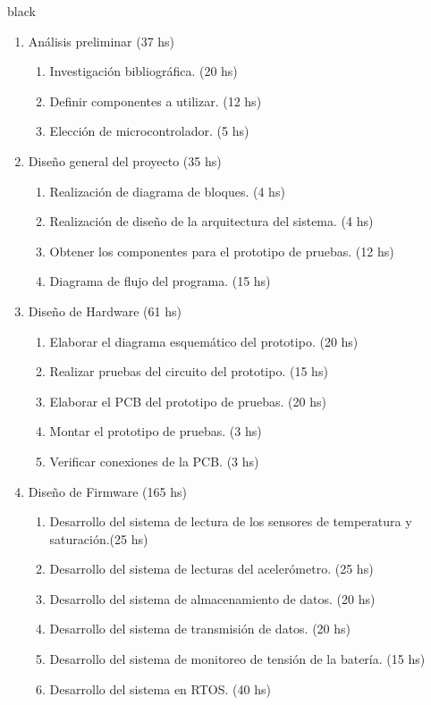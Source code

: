\documentclass[11pt]{charter}
\begin{document}
\begin{consigna}{black}
\vspace{-35px}
\begin{enumerate}
\item Análisis preliminar (37 hs)
	\begin{enumerate}
	\item Investigación bibliográfica. (20 hs)
	\item Definir componentes a utilizar.  (12 hs)
	\item Elección de microcontrolador. (5 hs)
	\end{enumerate}
\item Diseño general del proyecto (35 hs)
	\begin{enumerate}
	\item Realización de diagrama de bloques. (4 hs)
	\item Realización de diseño de la arquitectura del sistema. (4 hs)
	\item Obtener los componentes para el prototipo de pruebas. (12 hs)
	\item Diagrama de flujo del programa. (15 hs)	
	\end{enumerate}
\item Diseño de Hardware (61 hs)
	\begin{enumerate}
	\item Elaborar el diagrama esquemático del prototipo. (20 hs)
	\item Realizar pruebas del circuito del prototipo. (15 hs)
	\item Elaborar el PCB del prototipo de pruebas. (20 hs)
	\item Montar el prototipo de pruebas. (3 hs)
	\item Verificar conexiones de la PCB. (3 hs)
	\end{enumerate}
\item Diseño de Firmware (165 hs)
	\begin{enumerate}
	\item Desarrollo del sistema de lectura de los sensores de temperatura y saturación.(25 hs)
	\item Desarrollo del sistema de lecturas del acelerómetro. (25 hs)
	\item Desarrollo del sistema de almacenamiento de datos. (20 hs)
	\item Desarrollo del sistema de transmisión de datos. (20 hs)
	\item Desarrollo del sistema de monitoreo de tensión de la batería. (15 hs)
	\item Desarrollo del sistema en RTOS. (40 hs)

\end{enumerate}
\end{enumerate}
\end{consigna}
\end{document}
